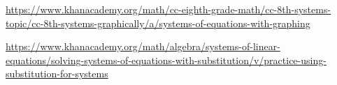 \begin{readinessAssuranceResources}
\item \url{https://www.khanacademy.org/math/cc-eighth-grade-math/cc-8th-systems-topic/cc-8th-systems-graphically/a/systems-of-equations-with-graphing}
\item \url{https://www.khanacademy.org/math/algebra/systems-of-linear-equations/solving-systems-of-equations-with-substitution/v/practice-using-substitution-for-systems}
\end{readinessAssuranceResources}
